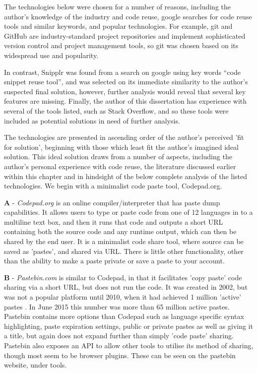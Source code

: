 The technologies below were chosen for a number of reasons, including the author's knowledge of the industry and code reuse, google searches for code reuse tools and similar keywords, and popular technologies. For example, git and GitHub are industry-standard project repositories and implement sophisticated version control and project management tools, so git was chosen based on its widespread use and popularity.

In contrast, Snipplr was found from a search on google using key words “code snippet reuse tool”, and was selected on its immediate similarity to the author's suspected final solution, however, further analysis would reveal that several key features are missing. Finally, the author of this dissertation has experience with several of the tools listed, such as Stack Overflow, and so these tools were included as potential solutions in need of further analysis.

The technologies are presented in ascending order of the author's perceived 'fit for solution', beginning with those which least fit the author's imagined ideal solution. This ideal solution draws from a number of aspects, including the author's personal experience with code reuse, the literature discussed earlier within this chapter and in hindsight of the below complete analysis of the listed technologies. We begin with a minimalist code paste tool, Codepad.org.

\textbf{A} - \textit{Codepad.org} is an online compiler/interpreter that has paste dump capabilities. It allows users to type or paste code from one of 12 languages in to a multiline text box, and then it runs that code and outputs a short URL containing both the source code and any runtime output, which can then be shared by the end user. It is a minimalist code share tool, where source can be saved as 'pastes', and shared via URL. There is little other functionality, other than the ability to make a paste private or save a paste to your account.

\textbf{B} - \textit{Pastebin.com} is similar to Codepad, in that it facilitates 'copy paste' code sharing via a short URL, but does not run the code. It was created in 2002, but was not a popular platform until 2010, when it had achieved 1 million 'active' pastes \cite{Kumparak2011}. In June 2015 this number was more than 65 million active pastes. Pastebin contains more options than Codepad such as language specific syntax highlighting, paste expiration settings, public or private pastes as well as giving it a title, but again does not expand further than simply 'code paste' sharing. Pastebin also exposes an API to allow other tools to utilise its method of sharing, though most seem to be browser plugins. These can be seen on the pastebin website, under tools.

